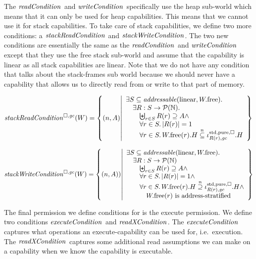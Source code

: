 \begin{jversion}
The $\readCond[]{}$ and $\writeCond[]{}$ specifically use the heap sub-world which means that it can only be used for heap capabilities.
This means that we cannot use it for stack capabilities.
To take care of stack capabilities, we define two more conditions: a $\stackReadCond[]{}$ and $\stackWriteCond[]{}$.
The two new conditions are essentially the same as the $\readCond[]{}$ and $\writeCond[]{}$ except that they use the free stack sub-world and assume that the capability is linear as all stack capabilities are linear.
Note that we do not have any condition that talks about the stack-frames sub world because we should never have a capability that allows us to directly read from or write to that part of memory.
\begin{definition}
\[
  \stackReadCond{W} = \left\{ \npair{A} \middle| 
    \begin{array}{l}
      \exists S \subseteq \addressable{\linear, \pwfree} \ldotp \\
      \quad \exists R : S \fun \powerset{\nats} \ldotp\\
      \qquad \biguplus_{r\in S} R(r) \supseteq A \wedge \\
      \qquad \forall r \in S \ldotp |R(r)| = 1\\
      \qquad \forall r \in S \ldotp \pwfree(r).H \nsubeq \stdreg{R(r),\gc}{\pure}.H
    \end{array}
  \right\}
\]
\end{definition}
\begin{definition}
\[
  \stackWriteCond{W} = \left\{ \npair{A}) \middle| 
    \begin{array}{l}
      \exists S \subseteq \addressable{\linear, \pwfree} \ldotp \\
      \quad \exists R : S \fun \powerset{\nats} \\
      \qquad \biguplus_{r\in S} R(r) \supseteq A \wedge \\
      \qquad \forall r \in S \ldotp |R(r)| = 1 \wedge \\
      \qquad \forall r \in S \ldotp \pwfree(r).H \nsupeq \stdreg{R(r),\gc}{\pure}.H \wedge\\
      \qquad \quad \pwfree(r) \text{ is address-stratified}
    \end{array}
  \right\}
\]
\end{definition}
The final permission we define conditions for is the execute permission.
We define two conditions $\execCond[]{}$ and $\xReadCond[]{}$.
The $\execCond[]{}$ captures what operations an execute-capability can be used for, i.e.\ execution.
The $\xReadCond[]{}$ captures some additional read assumptions we can make on a capability when we know the capability is executable.


\end{jversion}
